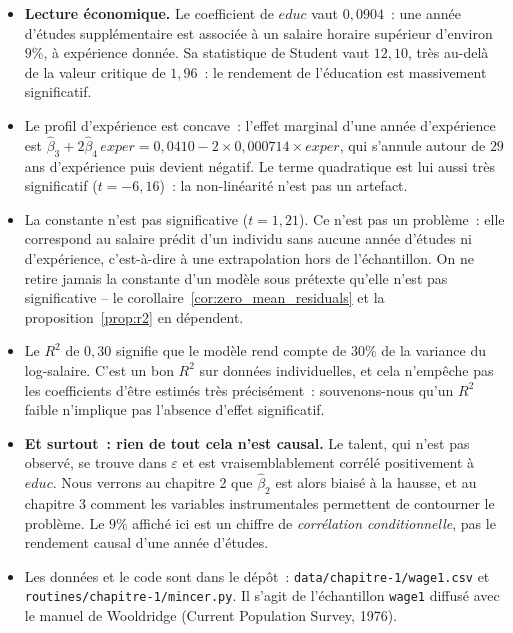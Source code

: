 \documentclass[10pt]{beamer}
\begin{document}
\begin{notes}

  \begin{itemize}

  \item \textbf{Lecture économique.} Le coefficient de $educ$ vaut $0{,}0904$~: une
    année d'études supplémentaire est associée à un salaire horaire supérieur
    d'environ $9\%$, à expérience donnée. Sa statistique de Student vaut $12{,}10$,
    très au-delà de la valeur critique de $1{,}96$~: le rendement de l'éducation est
    massivement significatif.\newline

  \item Le profil d'expérience est concave~: l'effet marginal d'une année d'expérience
    est $\hat\beta_3 + 2\hat\beta_4\,exper = 0{,}0410 - 2\times 0{,}000714\times exper$,
    qui s'annule autour de $29$ ans d'expérience puis devient négatif. Le terme
    quadratique est lui aussi très significatif ($t=-6{,}16$)~: la non-linéarité n'est
    pas un artefact.\newline

  \item La constante n'est pas significative ($t=1{,}21$). Ce n'est pas un problème~:
    elle correspond au salaire prédit d'un individu sans aucune année d'études ni
    d'expérience, c'est-à-dire à une extrapolation hors de l'échantillon. On ne retire
    jamais la constante d'un modèle sous prétexte qu'elle n'est pas significative -- le
    corollaire~\ref{cor:zero_mean_residuals} et la proposition~\ref{prop:r2} en
    dépendent.\newline

  \item Le $R^2$ de $0{,}30$ signifie que le modèle rend compte de $30\%$ de la
    variance du log-salaire. C'est un bon $R^2$ sur données individuelles, et cela
    n'empêche pas les coefficients d'être estimés très précisément~: souvenons-nous
    qu'un $R^2$ faible n'implique pas l'absence d'effet significatif.\newline

  \item \textbf{Et surtout~: rien de tout cela n'est causal.} Le talent, qui n'est pas
    observé, se trouve dans $\varepsilon$ et est vraisemblablement corrélé
    positivement à $educ$. Nous verrons au chapitre 2 que $\hat\beta_2$ est alors biaisé
    à la hausse, et au chapitre 3 comment les variables instrumentales permettent de
    contourner le problème. Le $9\%$ affiché ici est un chiffre de \emph{corrélation
    conditionnelle}, pas le rendement causal d'une année d'études.\newline

  \item Les données et le code sont dans le dépôt~:
    \texttt{data/\allowbreak chapitre-1/\allowbreak wage1.csv} et
    \texttt{routines/\allowbreak chapitre-1/\allowbreak mincer.py}. Il s'agit de l'échantillon \texttt{wage1}
    diffusé avec le manuel de Wooldridge (Current Population Survey, 1976).

  \end{itemize}

\end{notes}
\end{document}
